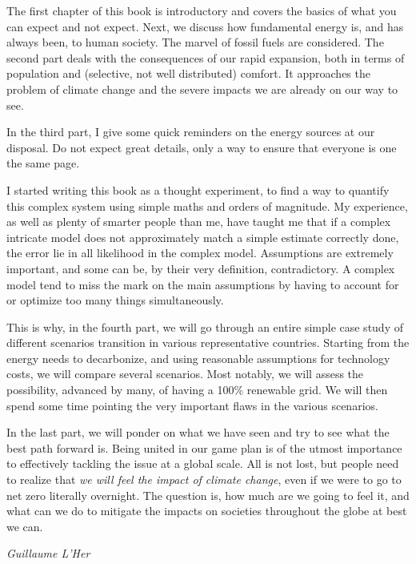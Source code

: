 The first chapter of this book is introductory and covers the basics of what you can expect and not expect. Next, we discuss how fundamental energy is, and has always been, to human society. The marvel of fossil fuels are considered. The second part deals with the consequences of our rapid expansion, both in terms of population and (selective, not well distributed) comfort. It approaches the problem of climate change and the severe impacts we are already on our way to see.

In the third part, I give some quick reminders on the energy sources at our disposal. Do not expect great details, only a way to ensure that everyone is one the same page.

I started writing this book as a thought experiment, to find a way to quantify this complex system using simple maths and orders of magnitude. My experience, as well as plenty of smarter people than me, have taught me that if a complex intricate model does not approximately match a simple estimate correctly done, the error lie in all likelihood in the complex model. Assumptions are extremely important, and some can be, by their very definition, contradictory. A complex model tend to miss the mark on the main assumptions by having to account for or optimize too many things simultaneously.

This is why, in the fourth part, we will go through an entire simple case study of different scenarios transition in various representative countries. Starting from the energy needs to decarbonize, and using reasonable assumptions for technology costs, we will compare several scenarios. Most notably, we will assess the possibility, advanced by many, of having a 100\% renewable grid. We will then spend some time pointing the very important flaws in the various scenarios.

In the last part, we will ponder on what we have seen and try to see what the best path forward is. Being united in our game plan is of the utmost importance to effectively tackling the issue at a global scale. All is not lost, but people need to realize that \emph{we will feel the impact of climate change}, even if we were to go to net zero literally overnight. The question is, how much are we going to feel it, and what can we do to mitigate the impacts on societies throughout the globe at best we can.

\begin{flushright}
	\textit{Guillaume L'Her}
\end{flushright}
